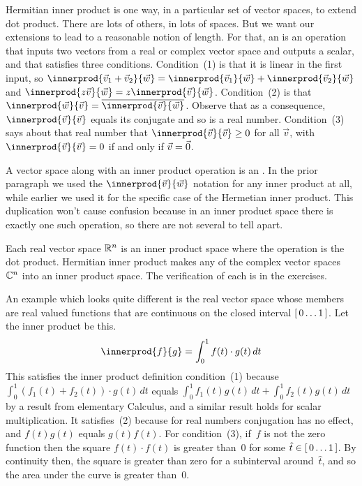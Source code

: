 Hermitian inner product is one way, in a particular set of vector spaces, 
to extend dot product.
There are lots of others, in lots of spaces.
But we want our extensions to lead to a reasonable notion of length.
For that,
an  is an operation
that inputs two vectors from a real or complex vector space 
and outputs a scalar, and that
satisfies three conditions.
Condition~(1) is that it is linear in the first input, so
$\innerprod{\vec{v}_1+\vec{v}_2}{\vec{w}}
 = \innerprod{\vec{v}_1}{\vec{w}}
   +\innerprod{\vec{v}_2}{\vec{w}}$
and $\innerprod{z\vec{v}}{\vec{w}}
     =z\innerprod{\vec{v}}{\vec{w}}$.
Condition~(2) is that
$\innerprod{\vec{w}}{\vec{v}}=\compconj{\innerprod{\vec{v}}{\vec{w}}}$.
Observe that as a consequence, 
$\innerprod{\vec{v}}{\vec{v}}$ equals its conjugate and
so is a real number.
Condition~(3) says about that real number that
$\innerprod{\vec{v}}{\vec{v}}\geq 0$ for all $\vec{v}$, with 
$\innerprod{\vec{v}}{\vec{v}}= 0$ if and only if $\vec{v}=\vec{0}$.

A vector space along with an inner product operation is an
.
In the prior paragraph we used the $\innerprod{\vec{v}}{\vec{w}}$ notation 
for any inner product at all, while earlier we used it for the specific case of
the Hermetian inner product.
This duplication won't cause confusion because in an inner product space there
is exactly one such operation, so there are not several to tell apart.

Each real vector space $\mathbb{R}^n$ is an inner product space
where the operation is the dot product. 
Hermitian inner product makes any of the complex vector spaces~$\mathbb{C}^n$ into 
an inner product space.
The verification of each is in the exercises.

An example which looks quite different 
is the real vector space whose members are
real valued functions that are continuous on the 
closed interval $[\,0\ldots 1\,]$.
Let the inner product be this.
\begin{equation*}
  \innerprod{f}{g}=\int_{0}^1 f(t)\cdot g(t)\,dt
\end{equation*}
This satisfies the inner product definition
condition~(1) because  
$\int_{0}^1 (f_1(t)+f_2(t))\cdot g(t)\,dt$ equals 
$\int_{0}^1 f_1(t)g(t)\,dt+\int_{0}^1 f_2(t)g(t)\,dt$
by a result from elementary Calculus,
and a similar result holds for scalar multiplication. 
It satisfies~(2) because for real numbers conjugation has no effect,
and $f(t)g(t)$ equals $g(t)f(t)$. 
For condition~(3), if~$f$ is not the zero function then 
the square $f(t)\cdot f(t)$ is greater than~$0$ for some 
$\hat{t}\in [\,0\ldots 1\,]$.
By continuity then, the square is greater than zero for a subinterval
around~$\hat{t}$,
and so the area under the curve is greater than~$0$.

